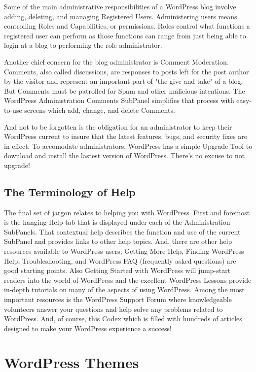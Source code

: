 Some of the main administrative responsibilities of a WordPress blog involve adding, deleting, and managing Registered Users. Administering users means controlling Roles and Capabilities, or permissions. Roles control what functions a registered user can perform as those functions can range from just being able to login at a blog to performing the role administrator.

Another chief concern for the blog administrator is Comment Moderation. Comments, also called discussions, are responses to posts left for the post author by the visitor and represent an important part of "the give and take" of a blog. But Comments must be patrolled for Spam and other malicious intentions. The WordPress Administration Comments SubPanel simplifies that process with easy-to-use screens which add, change, and delete Comments.

And not to be forgotten is the obligation for an administrator to keep their WordPress current to insure that the latest features, bugs, and security fixes are in effect. To accomodate administrators, WordPress has a simple Upgrade Tool to download and install the lastest version of WordPress. There's no excuse to not upgrade!

\subsection{The Terminology of Help}


The final set of jargon relates to helping you with WordPress. First and foremost is the hanging Help tab that is displayed under each of the Administration SubPanels. That contextual help describes the function and use of the current SubPanel and provides links to other help topics. And, there are other help resources available to WordPress users; Getting More Help, Finding WordPress Help, Troubleshooting, and WordPress FAQ (frequently asked questions) are good starting points. Also Getting Started with WordPress will jump-start readers into the world of WordPress and the excellent WordPress Lessons provide in-depth tutorials on many of the aspects of using WordPress. Among the most important resources is the WordPress Support Forum where knowledgeable volunteers answer your questions and help solve any problems related to WordPress. And, of course, this Codex which is filled with hundreds of articles designed to make your WordPress experience a success!




\section{WordPress Themes}

